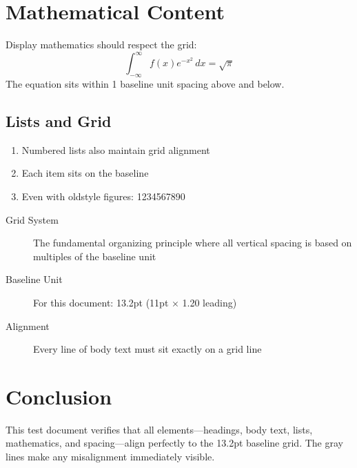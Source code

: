 \documentclass[11pt]{article}
\begin{document}
\section{Mathematical Content}

Display mathematics should respect the grid:
\[
\int_{-\infty}^{\infty} f(x) e^{-x^2} \, dx = \sqrt{\pi}
\]
The equation sits within 1 baseline unit spacing above and below.

\subsection{Lists and Grid}

\begin{enumerate}
\item Numbered lists also maintain grid alignment
\item Each item sits on the baseline
\item Even with oldstyle figures: 1234567890
\end{enumerate}

\begin{description}
\item[Grid System] The fundamental organizing principle where all vertical spacing is based on multiples of the baseline unit
\item[Baseline Unit] For this document: 13.2pt (11pt × 1.20 leading)
\item[Alignment] Every line of body text must sit exactly on a grid line
\end{description}

\section{Conclusion}

This test document verifies that all elements—headings, body text, lists, mathematics, and spacing—align perfectly to the 13.2pt baseline grid. The gray lines make any misalignment immediately visible.
\end{document}
